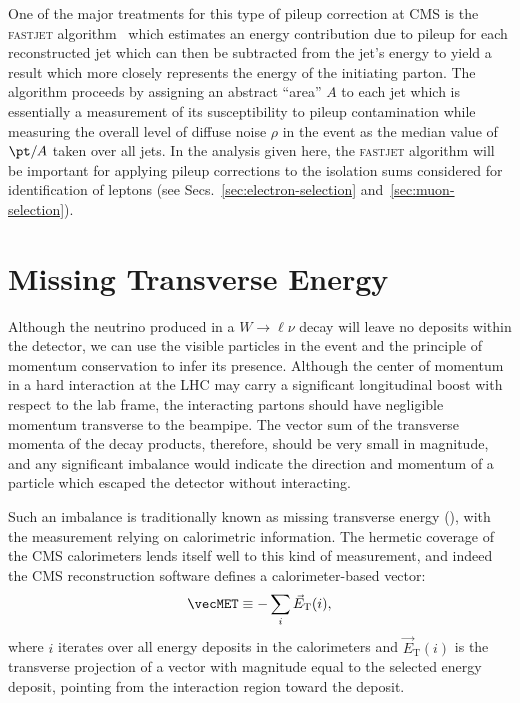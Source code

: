 One of the major treatments for this type of pileup correction at CMS is the \textsc{fastjet} algorithm~\cite{Cacciari:2007fd,Cacciari:2008gn} which estimates an energy contribution due to pileup for each reconstructed jet which can then be subtracted from the jet's energy to yield a result which more closely represents the energy of the initiating parton.  The algorithm proceeds by assigning an abstract ``area'' $A$ to each jet which is essentially a measurement of its susceptibility to pileup contamination while measuring the overall level of diffuse noise $\rho$ in the event as the median value of $\pt/A$ taken over all jets.  In the analysis given here, the \textsc{fastjet} algorithm will be important for applying pileup corrections to the isolation sums considered for identification of leptons (see Secs.~\ref{sec:electron-selection} and~\ref{sec:muon-selection}).

\section{Missing Transverse Energy}
\label{sec:met}

Although the neutrino produced in a $W \to \ell \nu$ decay will leave no deposits within the detector, we can use the visible particles in the event and the principle of momentum conservation to infer its presence.  Although the center of momentum in a hard interaction at the LHC may carry a significant longitudinal boost with respect to the lab frame, the interacting partons should have negligible momentum transverse to the beampipe.  The vector sum of the transverse momenta of the decay products, therefore, should be very small in magnitude, and any significant imbalance would indicate the direction and momentum of a particle which escaped the detector without interacting.

Such an imbalance is traditionally known as missing transverse energy (\MET), with the measurement relying on calorimetric information.  The hermetic coverage of the CMS calorimeters lends itself well to this kind of measurement, and indeed the CMS reconstruction software defines a calorimeter-based \MET vector:
\begin{equation}
  \vecMET \equiv - \sum_{i} \vec{E}_\text{T}(i),
\end{equation}
where $i$ iterates over all energy deposits in the calorimeters and $\vec{E}_\text{T}(i)$ is the transverse projection of a vector with magnitude equal to the selected energy deposit, pointing from the interaction region toward the deposit.

